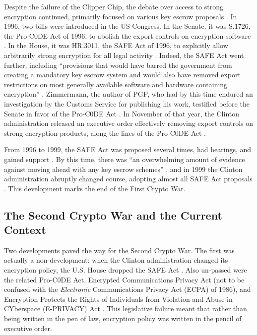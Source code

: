Despite the failure of the Clipper Chip, the debate over access to strong encryption continued, primarily focused on
various key escrow proposals \cite{thompson_2015}. In 1996, two bills were introduced in the US Congress. In the Senate,
it was S.1726, the Pro-C0DE Act of 1996, to abolish the export controls on encryption software \cite{burns_s1726_1996}.
In the House, it was HR.3011, the SAFE Act of 1996, to explicitly allow arbitrarily strong encryption for all legal
activity \cite{goodlatte_hr3011_1996}. Indeed, the SAFE Act went further, including ``provisions that would have
barred the government from creating a mandatory key escrow system and would also have removed export restrictions on
most generally available software and hardware containing encryption'' \cite{kehl_right_2015}. Zimmermann, the author of
PGP, who had by this time endured an investigation by the Customs Service for publishing his work, testified before the
Senate in favor of the Pro-C0DE Act \cite{zimmermann_1996}. In November of that year, the Clinton administration
released an executive order effectively removing export controls on strong encryption products, along the lines of the
Pro-C0DE Act \cite{clinton_1996}.

From 1996 to 1999, the SAFE Act was proposed several times, had hearings, and gained support \cite{kehl_right_2015}. By
this time, there was ``an overwhelming amount of evidence against moving ahead with any key escrow schemes''
\cite{thompson_2015}, and in 1999 the Clinton administration abruptly changed course, adopting almost all SAFE Act
proposals \cite{kehl_right_2015}. This development marks the end of the First Crypto War.

\subsection{The Second Crypto War and the Current Context}
\label{sec-cwii-context}

Two developments paved the way for the Second Crypto War. The first was actually a non-development: when the Clinton
administration changed its encryption policy, the U.S. House dropped the SAFE Act \cite{kehl_right_2015}. Also un-passed
were the related Pro-C0DE Act, Encrypted Communications Privacy Act (not to be confused with the \textit{Electronic}
Communications Privacy Act (ECPA) of 1986), and Encryption Protects the Rights of Individuals from Violation and Abuse
in CYberspace (E-PRIVACY) Act \cite{leahy_s376_1997} \cite{ashcroft_s2067_1998}. This legislative failure meant that
rather than being written in the pen of law, encryption policy was written in the pencil of executive order.

